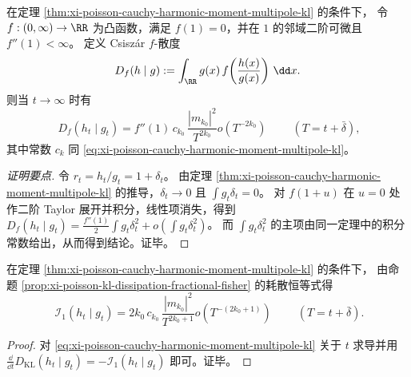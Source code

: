 \begin{proposition}\label{prop:xi-poisson-cauchy-fdiv-harmonic-multipole}
在定理 \ref{thm:xi-poisson-cauchy-harmonic-moment-multipole-kl} 的条件下，
令 \(f:(0,\infty)\to\RR\) 为凸函数，满足 \(f(1)=0\)，并在 \(1\) 的邻域二阶可微且 \(f''(1)<\infty\)。
定义 Csisz\'ar \texorpdfstring{$f$}{f}-散度
\[
D_f(h\mid g):=\int_{\RR} g(x)\,f\!\left(\frac{h(x)}{g(x)}\right)\,\dd x.
\]
则当 \(t\to\infty\) 时有
\[
\boxed{\;
D_f(h_t\mid g_t)
=f''(1)\,c_{k_0}\,\frac{|m_{k_0}|^2}{T^{2k_0}}
o\!\left(T^{-2k_0}\right)\;}
\qquad(T=t+\bar\delta),
\]
其中常数 \(c_k\) 同 \eqref{eq:xi-poisson-cauchy-harmonic-moment-multipole-kl}。
\end{proposition}
\begin{proof}[证明要点]
令 \(r_t=h_t/g_t=1+\delta_t\)。
由定理 \ref{thm:xi-poisson-cauchy-harmonic-moment-multipole-kl} 的推导，\(\delta_t\to0\) 且 \(\int g_t\delta_t=0\)。
对 \(f(1+u)\) 在 \(u=0\) 处作二阶 Taylor 展开并积分，线性项消失，得到
\(
D_f(h_t\mid g_t)=\frac{f''(1)}{2}\int g_t\delta_t^2+o(\int g_t\delta_t^2)
\)。
而 \(\int g_t\delta_t^2\) 的主项由同一定理中的积分常数给出，从而得到结论。证毕。
\end{proof}

\begin{corollary}[相对熵耗散量的多极幂律常数]\label{cor:xi-poisson-cauchy-fisher-harmonic-multipole}
在定理 \ref{thm:xi-poisson-cauchy-harmonic-moment-multipole-kl} 的条件下，
由命题 \ref{prop:xi-poisson-kl-dissipation-fractional-fisher} 的耗散恒等式得
\[
\boxed{\;
\mathcal I_1(h_t\mid g_t)
=2k_0\,c_{k_0}\,\frac{|m_{k_0}|^2}{T^{2k_0+1}}
o\!\left(T^{-(2k_0+1)}\right)\;}
\qquad(T=t+\bar\delta).
\]
\end{corollary}
\begin{proof}
对 \eqref{eq:xi-poisson-cauchy-harmonic-moment-multipole-kl} 关于 \(t\) 求导并用
\(
\frac{\dd}{\dd t}D_{\mathrm{KL}}(h_t\mid g_t)=-\mathcal I_1(h_t\mid g_t)
\)
即可。证毕。
\end{proof}

